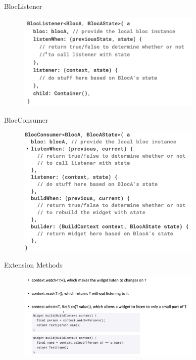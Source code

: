 \documentclass{../libs/presentation_format}
\begin{document}

\begin{frame}{BlocListener}
	\begin{figure}[htpb]
		\centering
		\includegraphics[width=9cm]{../libs/bloc-listener}
	\end{figure}
\end{frame}


\begin{frame}{BlocConsumer}
	\begin{figure}[htpb]
		\centering
		\includegraphics[width=9cm]{../libs/bloc-consumer}
	\end{figure}
\end{frame}


\begin{frame}{Extension Methods}
	\begin{figure}[htpb]
		\centering
		\includegraphics[width=9cm]{../libs/extension-methods}
	\end{figure}
\end{frame}
\end{document}
